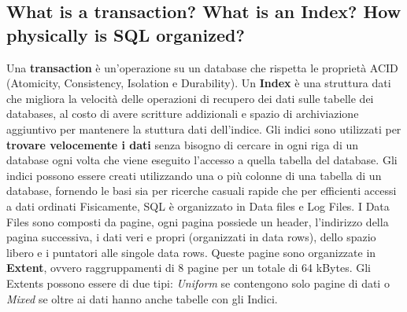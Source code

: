 \documentclass{article}
\begin{document}
\subsection{What is a transaction? What is an Index? How physically is SQL organized?}
Una \textbf{transaction} è un'operazione su un database che rispetta le proprietà ACID (Atomicity, Consistency, Isolation e Durability).
\newline Un \textbf{Index} è una struttura dati che migliora la velocità delle operazioni di recupero dei dati sulle tabelle dei databases, al costo di avere scritture addizionali e spazio di archiviazione aggiuntivo per mantenere la stuttura dati dell'indice. Gli indici sono utilizzati per \textbf{trovare velocemente i dati} senza bisogno di cercare in ogni riga di un database ogni volta che viene eseguito l'accesso a quella tabella del database. Gli indici possono essere creati utilizzando una o più colonne di una tabella di un database, fornendo le basi sia per ricerche casuali rapide che per efficienti accessi a dati ordinati
\newline Fisicamente, SQL è organizzato in Data files e Log Files. I Data Files sono composti da pagine, ogni pagina possiede un header, l'indirizzo della pagina successiva, i dati veri e propri (organizzati in data rows), dello spazio libero e i puntatori alle singole data rows. Queste pagine sono organizzate in \textbf{Extent}, ovvero raggruppamenti di 8 pagine per un totale di 64 kBytes. Gli Extents possono essere di due tipi: \textit{Uniform} se contengono solo pagine di dati o \textit{Mixed} se oltre ai dati hanno anche tabelle con gli Indici.
\end{document}
